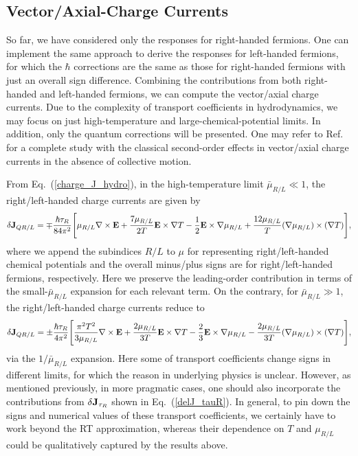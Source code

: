 \documentclass[aps,prd,showkeys,preprint,amsmath,amssymb,nofootinbib]{revtex4-1}
\begin{document}
\subsection{Vector/Axial-Charge Currents}\label{va_currents}
So far, we have considered only the responses for right-handed fermions. One can implement the same approach to derive the responses for left-handed fermions, for which the $\hbar$ corrections are the same as those for right-handed fermions with just an overall sign difference. Combining the contributions from both right-handed and left-handed fermions, we can compute the vector/axial charge currents. Due to the complexity of transport coefficients in hydrodynamics, we may focus on just high-temperature and large-chemical-potential limits. In addition, only the quantum corrections will be presented. One may refer to Ref.~\cite{Gorbar:2016qfh} for a complete study with the classical second-order effects in vector/axial charge currents in the absence of collective motion. 

From Eq.~(\ref{charge_J_hydro}), in the high-temperature limit $\bar{\mu}_{R/L}\ll 1$, the right/left-handed charge currents are given by 
\begin{eqnarray}\label{charge_J_R_highT}\nonumber
\delta {\bf J}_{QR/L}=\mp\frac{\hbar\tau_R}{84\pi^2}\Bigg[\mu_{R/L}\nabla\times{\bf E}+\frac{7\mu_{R/L}}{2T}{\bf E}\times\nabla T-\frac{1}{2}{\bf E}\times\nabla \mu_{R/L}+\frac{12\mu_{R/L}}{T}(\nabla\mu_{R/L})\times(\nabla T)
\Bigg],
\\
\end{eqnarray}
where we append the subindices $R/L$ to $\mu$ for representing right/left-handed chemical potentials and the overall minus/plus signs are for right/left-handed fermions, respectively. Here we preserve the leading-order contribution in terms of the small-$\bar{\mu}_{R/L}$ expansion for each relevant term. On the contrary, for $\bar{\mu}_{R/L}\gg 1$, the right/left-handed charge currents reduce to  
\begin{eqnarray}\label{charge_J_R_lowT}\nonumber
\delta {\bf J}_{QR/L}=\pm\frac{\hbar\tau_R}{4\pi^2}\Bigg[\frac{\pi^2 T^2}{3\mu_{R/L}}\nabla\times{\bf E}+\frac{2\mu_{R/L}}{3T}{\bf E}\times\nabla T-\frac{2}{3}{\bf E}\times\nabla \mu_{R/L}-\frac{2\mu_{R/L}}{3T}(\nabla\mu_{R/L})\times(\nabla T)
\Bigg],
\\
\end{eqnarray}  
via the $1/\bar{\mu}_{R/L}$ expansion.
Here some of transport coefficients change signs in different limits, for which the reason in underlying physics is unclear. However, as mentioned previously, in more pragmatic cases, one should also incorporate the contributions from $\delta {\bf J}_{\tau_R}$ shown in Eq.~(\ref{delJ_tauR}). In general, to pin down the signs and numerical values of these transport coefficients, we certainly have to work beyond the RT approximation, whereas their dependence on $T$ and $\mu_{R/L}$ could be  qualitatively captured by the results above.   
\end{document}
